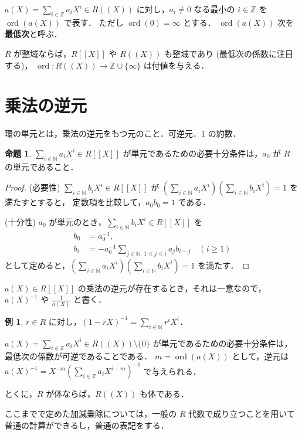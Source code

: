 \documentclass{jsarticle}
\DeclareMathOperator{\ord}{ord}
\newcommand{\N}{\mathbb{N}}
\newcommand{\Z}{\mathbb{Z}}
\newcommand{\longto}{\longrightarrow}
\theoremstyle{definition}
\newtheorem*{Exm}{例}
\newtheorem{Prp}{命題}
\newenvironment{exm}{\begin{leftbar}\begin{Exm}}{\end{Exm}\end{leftbar}}
\newenvironment{prp}{\vspace{1ex}\begin{screen}\begin{Prp}}{\end{Prp}\end{screen}}
\newenvironment{prf}{\begin{leftbar}\begin{proof}}{\end{proof}\end{leftbar}}
\begin{document}
$a(X) = \sum_{i\in\Z} a_i X^i \in R((X))$ に対し，$a_i \ne 0$ なる最小の $i \in \Z$ を $\ord(a(X))$ で表す．
ただし $\ord(0) = \infty$ とする．
$\ord(a(X))$ 次を\textbf{最低次}と呼ぶ．

$R$ が整域ならば，$R[[X]]$ や $R((X))$ も整域であり (最低次の係数に注目する)，
$\ord\colon R((X)) \longto \Z \cup \{\infty\}$ は付値を与える．


\section{乗法の逆元}
環の単元とは，乗法の逆元をもつ元のこと．可逆元．$1$ の約数．

\begin{prp}
  $\sum_{i\in\N} a_i X^i \in R[[X]]$ が単元であるための必要十分条件は，$a_0$ が $R$ の単元であること．
\end{prp}
\begin{prf}
  (必要性)
  $\sum_{i\in\N} b_i X^i \in R[[X]]$ が $\left(\sum_{i\in\N} a_i X^i\right) \left(\sum_{i\in\N} b_i X^i\right) = 1$ を満たすとすると，
  定数項を比較して，$a_0 b_0 = 1$ である．

  (十分性)
  $a_0$ が単元のとき，$\sum_{i\in\N} b_i X^i \in R[[X]]$ を
  \begin{align*}
    b_0 &= a_0^{-1}, \\
    b_i &= -a_0^{-1} \sum_{j\in\N,\,1\le j\le i} a_j b_{i-j} \quad (i \ge 1)
  \end{align*}
  として定めると，$\left(\sum_{i\in\N} a_i X^i\right) \left(\sum_{i\in\N} b_i X^i\right) = 1$ を満たす．
\end{prf}

$a(X) \in R[[X]]$ の乗法の逆元が存在するとき，それは一意なので，
$a(X)^{-1}$ や $\frac{1}{a(X)}$ と書く．

\begin{exm}
  $r \in R$ に対し，$(1 - r X)^{-1} = \sum_{i\in\N} r^i X^i$．
\end{exm}

$a(X) = \sum_{i\in\Z} a_i X^i \in R((X)) \setminus \{0\}$ が単元であるための必要十分条件は，
最低次の係数が可逆であることである．
$m = \ord(a(X))$ として，逆元は $a(X)^{-1} = X^{-m} \left(\sum_{i\in\Z} a_{i} X^{i-m}\right)^{-1}$ で与えられる．

とくに，$R$ が体ならば，$R((X))$ も体である．

ここまでで定めた加減乗除については，一般の $R$ 代数で成り立つことを用いて普通の計算ができるし，普通の表記をする．
\end{document}
